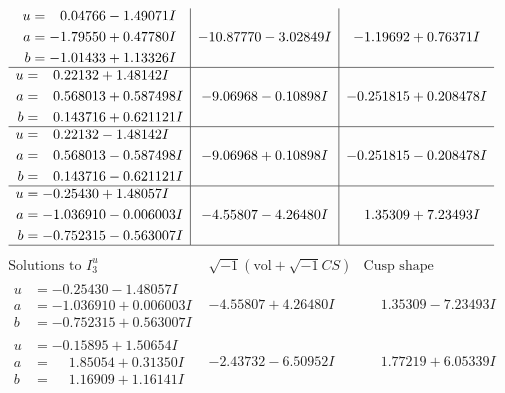\documentclass[1p]{elsarticle_modified}
\theoremstyle{definition}
\newcommand{\I}{\sqrt{-1}}
\begin{document}
$$\begin{array}{c|c|c}
\begin{aligned}
u &= \phantom{-}0.04766 - 1.49071 I \\
a &= -1.79550 + 0.47780 I \\
b &= -1.01433 + 1.13326 I\end{aligned}
 & -10.87770 - 3.02849 I & -1.19692 + 0.76371 I \\ \hline\begin{aligned}
u &= \phantom{-}0.22132 + 1.48142 I \\
a &= \phantom{-}0.568013 + 0.587498 I \\
b &= \phantom{-}0.143716 + 0.621121 I\end{aligned}
 & -9.06968 - 0.10898 I & -0.251815 + 0.208478 I \\ \hline\begin{aligned}
u &= \phantom{-}0.22132 - 1.48142 I \\
a &= \phantom{-}0.568013 - 0.587498 I \\
b &= \phantom{-}0.143716 - 0.621121 I\end{aligned}
 & -9.06968 + 0.10898 I & -0.251815 - 0.208478 I \\ \hline\begin{aligned}
u &= -0.25430 + 1.48057 I \\
a &= -1.036910 - 0.006003 I \\
b &= -0.752315 - 0.563007 I\end{aligned}
 & -4.55807 - 4.26480 I & \phantom{-}1.35309 + 7.23493 I\\
 \hline 
 \end{array}$$\newpage$$\begin{array}{c|c|c}  
\text{Solutions to }I^u_{3}& \I (\text{vol} + \sqrt{-1}CS) & \text{Cusp shape}\\
 \hline 
\begin{aligned}
u &= -0.25430 - 1.48057 I \\
a &= -1.036910 + 0.006003 I \\
b &= -0.752315 + 0.563007 I\end{aligned}
 & -4.55807 + 4.26480 I & \phantom{-}1.35309 - 7.23493 I \\ \hline\begin{aligned}
u &= -0.15895 + 1.50654 I \\
a &= \phantom{-}1.85054 + 0.31350 I \\
b &= \phantom{-}1.16909 + 1.16141 I\end{aligned}
 & -2.43732 - 6.50952 I & \phantom{-}1.77219 + 6.05339 I \\ \hline\begin{aligned}

\end{aligned}
\end{array}$$
\end{document}
